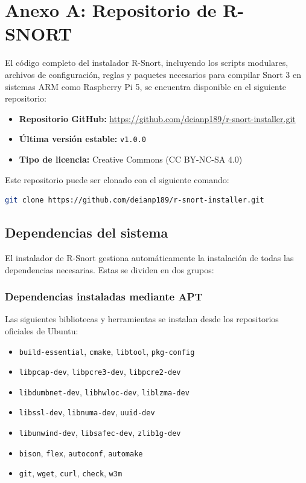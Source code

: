 \documentclass[11pt,a4paper,twoside]{report}
\begin{document}
\appendix
\chapter{Anexo A: Repositorio de R-SNORT}
\label{anexo_repositorio}

El código completo del instalador R-Snort, incluyendo los scripts modulares, archivos de configuración, reglas y paquetes necesarios para compilar Snort 3 en sistemas ARM como Raspberry Pi 5, se encuentra disponible en el siguiente repositorio:

\begin{itemize}
	\item \textbf{Repositorio GitHub:} \url{https://github.com/deianp189/r-snort-installer.git}
	\item \textbf{Última versión estable:} \texttt{v1.0.0}
	\item \textbf{Tipo de licencia:} Creative Commons (CC BY-NC-SA 4.0)
\end{itemize}

Este repositorio puede ser clonado con el siguiente comando:

\begin{lstlisting}[language=bash]
	git clone https://github.com/deianp189/r-snort-installer.git
\end{lstlisting}

\section*{Dependencias del sistema}
El instalador de R-Snort gestiona automáticamente la instalación de todas las dependencias necesarias. Estas se dividen en dos grupos:

\subsection*{Dependencias instaladas mediante APT}
Las siguientes bibliotecas y herramientas se instalan desde los repositorios oficiales de Ubuntu:

\begin{itemize}
	\item \texttt{build-essential}, \texttt{cmake}, \texttt{libtool}, \texttt{pkg-config}
	\item \texttt{libpcap-dev}, \texttt{libpcre3-dev}, \texttt{libpcre2-dev}
	\item \texttt{libdumbnet-dev}, \texttt{libhwloc-dev}, \texttt{liblzma-dev}
	\item \texttt{libssl-dev}, \texttt{libnuma-dev}, \texttt{uuid-dev}
	\item \texttt{libunwind-dev}, \texttt{libsafec-dev}, \texttt{zlib1g-dev}
	\item \texttt{bison}, \texttt{flex}, \texttt{autoconf}, \texttt{automake}
	\item \texttt{git}, \texttt{wget}, \texttt{curl}, \texttt{check}, \texttt{w3m}
\end{itemize}
\end{document}
